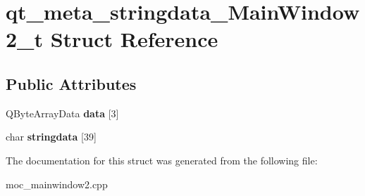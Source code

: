 \hypertarget{structqt__meta__stringdata__MainWindow2__t}{\section{qt\-\_\-meta\-\_\-stringdata\-\_\-\-Main\-Window2\-\_\-t Struct Reference}
\label{structqt__meta__stringdata__MainWindow2__t}
}
\subsection*{Public Attributes}
\begin{DoxyCompactItemize}
\item 
\hypertarget{structqt__meta__stringdata__MainWindow2__t_a3f7532984c6401dd0839678d6cbdab07}{Q\-Byte\-Array\-Data {\bfseries data} \mbox{[}3\mbox{]}}\label{structqt__meta__stringdata__MainWindow2__t_a3f7532984c6401dd0839678d6cbdab07}

\item 
\hypertarget{structqt__meta__stringdata__MainWindow2__t_ac971b5b277de36bd90802679966ca021}{char {\bfseries stringdata} \mbox{[}39\mbox{]}}\label{structqt__meta__stringdata__MainWindow2__t_ac971b5b277de36bd90802679966ca021}

\end{DoxyCompactItemize}


The documentation for this struct was generated from the following file\-:\begin{DoxyCompactItemize}
\item 
moc\-\_\-mainwindow2.\-cpp\end{DoxyCompactItemize}
